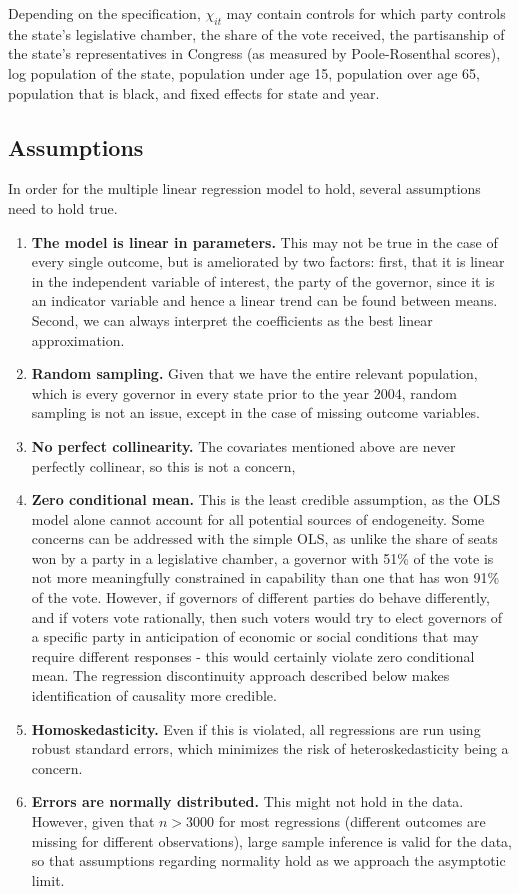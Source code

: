 \documentclass{article}
\begin{document}
Depending on the specification, $\chi_{it}$ may contain controls for which party controls the state's legislative chamber, the share of the vote received, the partisanship of the state's representatives in Congress (as measured by Poole-Rosenthal scores), log population of the state, population under age 15, population over age 65, population that is black, and fixed effects for state and year. 

\subsection{Assumptions}

In order for the multiple linear regression model to hold, several assumptions need to hold true.
\begin{enumerate}
\item \textbf{The model is linear in parameters.} This may not be true in the case of every single outcome, but is ameliorated by two factors: first, that it is linear in the independent variable of interest, the party of the governor, since it is an indicator variable and hence a linear trend can be found between means. Second, we can always interpret the coefficients as the best linear approximation.
\item \textbf{Random sampling.} Given that we have the entire relevant population, which is every governor in every state prior to the year 2004, random sampling is not an issue, except in the case of missing outcome variables. 
\item \textbf{No perfect collinearity.} The covariates mentioned above are never perfectly collinear, so this is not a concern, 
\item \textbf{Zero conditional mean.} This is the least credible assumption, as the OLS model alone cannot account for all potential sources of endogeneity. Some concerns can be addressed with the simple OLS, as unlike the share of seats won by a party in a legislative chamber, a governor with 51\% of the vote is not more meaningfully constrained in capability than one that has won 91\% of the vote. However, if governors of different parties do behave differently, and if voters vote rationally, then such voters would try to elect governors of a specific party in anticipation of economic or social conditions that may require different responses - this would certainly violate zero conditional mean. The regression discontinuity approach described below makes identification of causality more credible.
\item \textbf{Homoskedasticity.} Even if this is violated, all regressions are run using robust standard errors, which minimizes the risk of heteroskedasticity being a concern.
\item \textbf{Errors are normally distributed.} This might not hold in the data. However, given that $n > 3000$ for most regressions (different outcomes are missing for different observations), large sample inference is valid for the data, so that assumptions regarding normality hold as we approach the asymptotic limit.
\end{enumerate}
\end{document}
